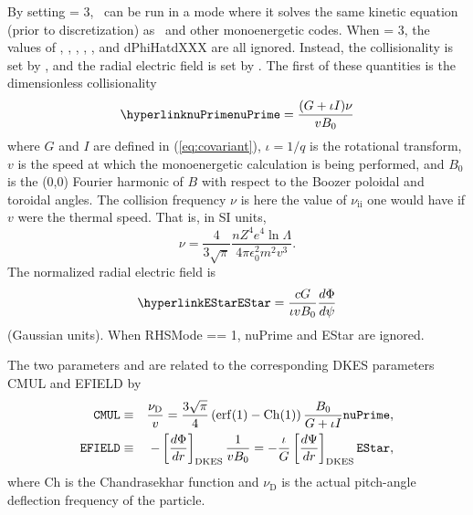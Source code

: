 By setting  = 3, \sfincs~can be run in a mode
where it solves the same kinetic equation (prior to discretization) as 
\dkes~and other monoenergetic codes.
When  = 3, the values of , , ,
, , and {\ttfamily dPhiHatdXXX} are all ignored.
Instead, the collisionality is set by , and the radial electric field is set
by .  The first of these quantities is the dimensionless collisionality
\begin{equation}
\mbox{\parlink{nuPrime}} = \frac{(G+\iota I) \nu}{v B_0}
\end{equation}
where $G$ and $I$ are defined in (\ref{eq:covariant}), $\iota=1/q$ is the rotational transform,
$v$ is the speed at which the monoenergetic calculation is being performed, and $B_0$ is the (0,0) Fourier harmonic of $B$
with respect to the Boozer poloidal and toroidal angles. The collision
frequency $\nu$ is here the value of $\nu_\mathrm{ii}$ one would have if
$v$ were the thermal speed. That is, in SI units,
\begin{equation}
  \nu=\frac{4}{3\sqrt{\pi}}\frac{n Z^4e^4\ln \Lambda}{4\pi\epsilon_0^2m^2v^3}.
\end{equation}
%
The normalized radial electric field is
\begin{equation}
\mbox{\parlink{EStar}} = \frac{cG}{\iota v B_0} \frac{d\Phi}{d\psi}
\end{equation}
(Gaussian units).
When {\ttfamily RHSMode} == 1, {\ttfamily nuPrime} and {\ttfamily EStar} are ignored.

The two parameters  and  are
related to the corresponding DKES parameters {\ttfamily CMUL} and
{\ttfamily EFIELD} by
\begin{eqnarray}
  \mbox{\ttfamily
    CMUL}&\equiv&\frac{\nu_\mathrm{D}}{v}=\frac{3\sqrt{\pi}}{4}\left(\mathrm{erf}(1)-\mathrm{Ch}(1)\right)
  \frac{B_0}{G+\iota I}\mbox{\ttfamily nuPrime},\\
  \mbox{\ttfamily EFIELD}&\equiv&-\left[\frac{d\Phi}{dr}\right]_\mathrm{DKES}\frac{1}{vB_0}=-\frac{\iota}{G}\left[\frac{d\Psi}{dr}\right]_\mathrm{DKES}\mbox{\ttfamily EStar},
\end{eqnarray}
where $\mathrm{Ch}$ is the Chandrasekhar function and $\nu_\mathrm{D}$
is the actual pitch-angle deflection frequency of the particle.
